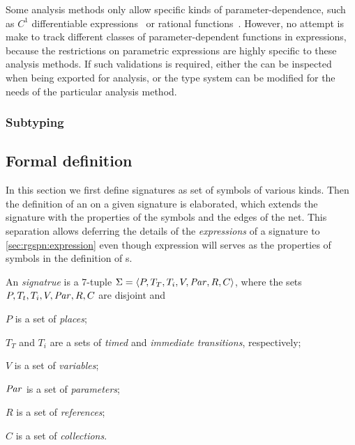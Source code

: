 Some analysis methods only allow specific kinds of parameter-dependence, such as \(C^1\) differentiable expressions~\citep{Blake88sensitivity} or rational functions~\citep{Blake88sensitivity}. However, no attempt is make to track different classes of parameter-dependent functions in  expressions, because the restrictions on parametric expressions are highly specific to these analysis methods. If such validations is required, either the  can be inspected when being exported for analysis, or the type system can be modified for the needs of the particular analysis method.

\subsubsection{Subtyping}


\subsection{Formal definition}

In this section we first define  signatures as set of symbols of various kinds. Then the definition of an  on a given signature is elaborated, which extends the signature with the properties of the symbols and the edges of the net. This separation allows deferring the details of the \emph{expressions} of a signature to \vref{sec:rgspn:expression} even though expression will serves as the properties of symbols in the definition of s.

\begin{dfn}
  An \emph{ signatrue} is a 7-tuple \(\Sigma = \langle P, T_T, T_i, V, \textrm{\itshape Par\/}, R, C \rangle\), where the sets \(P, T_t, T_i, V, \textrm{\itshape Par\/}, R, C\) are disjoint and
  \begin{compactitem}
  \item \(P\) is a set of \emph{places};
  \item \(T_T\) and \(T_i\) are a sets of \emph{timed} and \emph{immediate transitions}, respectively;
  \item \(V\) is a set of \emph{variables};
  \item \(\textrm{\itshape Par\/}\) is a set of \emph{parameters};
  \item \(R\) is a set of \emph{references};
  \item \(C\) is a set of \emph{collections}.
  \end{compactitem}
\end{dfn}

